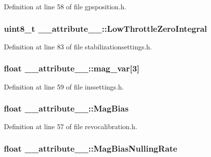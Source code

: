 \-Definition at line 58 of file gpsposition.\-h.

\hypertarget{struct____attribute_____a7db230ee18e7e568573aa462bf15fcff}{
\subsubsection[{\-Low\-Throttle\-Zero\-Integral}]{\setlength{\rightskip}{0pt plus 5cm}uint8\-\_\-t {\bf \-\_\-\-\_\-attribute\-\_\-\-\_\-\-::\-Low\-Throttle\-Zero\-Integral}}}\label{struct____attribute_____a7db230ee18e7e568573aa462bf15fcff}


\-Definition at line 83 of file stabilizationsettings.\-h.

\hypertarget{struct____attribute_____a7f886251ed8a8f00712f5aeb0e062055}{
\subsubsection[{mag\-\_\-var}]{\setlength{\rightskip}{0pt plus 5cm}float {\bf \-\_\-\-\_\-attribute\-\_\-\-\_\-\-::mag\-\_\-var}\mbox{[}3\mbox{]}}}\label{struct____attribute_____a7f886251ed8a8f00712f5aeb0e062055}


\-Definition at line 59 of file inssettings.\-h.

\hypertarget{struct____attribute_____a076e1ef0723c72dd8b7d003024642c73}{
\subsubsection[{\-Mag\-Bias}]{\setlength{\rightskip}{0pt plus 5cm}float {\bf \-\_\-\-\_\-attribute\-\_\-\-\_\-\-::\-Mag\-Bias}}}\label{struct____attribute_____a076e1ef0723c72dd8b7d003024642c73}


\-Definition at line 57 of file revocalibration.\-h.

\hypertarget{struct____attribute_____ac2135817edec66ff039c7940bc638d2e}{
\subsubsection[{\-Mag\-Bias\-Nulling\-Rate}]{\setlength{\rightskip}{0pt plus 5cm}float {\bf \-\_\-\-\_\-attribute\-\_\-\-\_\-\-::\-Mag\-Bias\-Nulling\-Rate}}}\label{struct____attribute_____ac2135817edec66ff039c7940bc638d2e}


